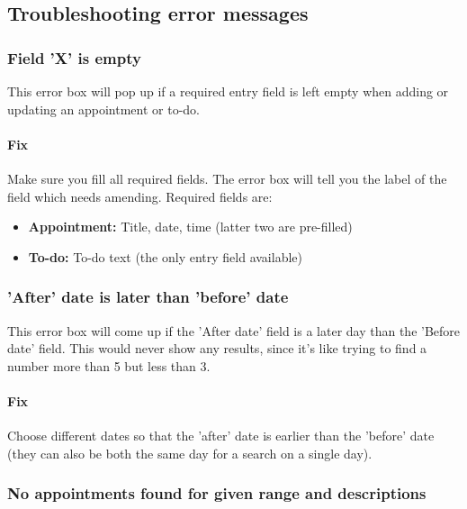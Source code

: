 \subsection{Troubleshooting error messages}
\subsubsection{Field 'X' is empty}


This error box will pop up if a required entry field is left empty when
adding or updating an appointment or to-do.

\paragraph{Fix}
Make sure you fill all required fields. The error box will tell you the label of
the field which needs amending. Required fields are:

\begin{itemize}
    \item \textbf{Appointment:} Title, date, time (latter two are pre-filled)
    \item \textbf{To-do:} To-do text (the only entry field available)
\end{itemize}


\subsubsection{'After' date is later than 'before' date}


This error box will come up if the 'After date' field is a later day than the
'Before date' field. This would never show any results, since it's like trying
to find a number more than 5 but less than 3.

\paragraph{Fix}
Choose different dates so that the 'after' date is earlier than the 'before'
date (they can also be both the same day for a search on a single day).


\subsubsection{No appointments found for given range and descriptions}


